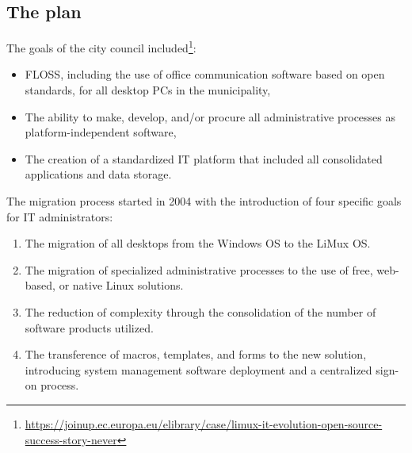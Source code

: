 \subsection{The plan}
The goals of the city council included\footnote{\url{https://joinup.ec.europa.eu/elibrary/case/limux-it-evolution-open-source-success-story-never}}:
\begin{itemize}[itemsep=0ex]
\item FLOSS, including the use of office communication software based on open standards, for all desktop PCs in the municipality,
\item The ability to make, develop, and/or procure all administrative processes as platform-independent software,
\item The creation of a standardized IT platform that included all consolidated applications and data storage.
\end{itemize}
The migration process started in 2004 with the introduction of four specific goals for IT administrators:
\begin{enumerate}[itemsep=0ex]
\item The migration of all desktops from the Windows OS to the LiMux OS.
\item The migration of specialized administrative processes to the use of free, web-based, or native Linux solutions.
 \item The reduction of complexity through the consolidation of the number of software products utilized.
\item The transference of macros, templates, and forms to the new solution, introducing system management software deployment and a centralized sign-on process. 
\end{enumerate}
